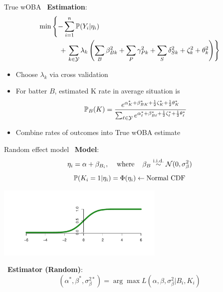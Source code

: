 \documentclass{beamer}
\def\Y{\mathcal Y}\def\Z{\mathcal Z}
\def\l{\left}\def\r{\right}\def\lf{\lfloor}\def\rf{\rfloor}
\def\iid{\stackrel{\mbox{\scriptsize i.i.d.}}{\sim}}
\begin{document}
\begin{frame}{True wOBA}
~{\bf Estimation}:
\begin{align*}
\min&\l\{-\sum_{i=1}^n\mP(Y_i|\eta_i)\r.\\
    &\hspace{4mm} + \l.\sum_{k\in\Y}\lambda_k\l(\sum_B\beta_{Bk}^2
    + \sum_P\gamma_{Pk}^2 + \sum_S\delta_{Sk}^2 + \zeta_k^2 + \theta_k^2\r)\r\}
\end{align*}
\begin{itemize}
    \item Choose $\lambda_k$ via cross validation
    \item For batter $B$, estimated K rate in average situation is
    $$\mP_B(K) = \frac{e^{\alpha^*_K + \beta^*_{BK} + \frac12\zeta^*_K +
    \frac12\theta^*_K}}{\sum_{\ell\in\Y}e^{\alpha^*_\ell + \beta^*_{B\ell} +
    \frac12\zeta^*_\ell + \frac12\theta^*_\ell}}$$
    \item Combine rates of outcomes into True wOBA estimate
\end{itemize}
\end{frame}

\begin{frame}{Random effect model}
~{\bf Model}:
$$\eta_i = \alpha + \beta_{B_i}, \hspace{4mm}\mbox{where}\hspace{4mm}
\beta_B \iid \N(0, \sigma^2_\beta)$$
$$\mathbb P(K_i = 1|\eta_i) = \Phi(\eta_i) \leftarrow \mbox{Normal CDF}$$
\begin{center}
\includegraphics[width = 0.6\textwidth]{../figs/normalcdf.pdf}
\end{center}
~{\bf Estimator (Random)}:
$$(\alpha^*, \beta^*, \sigma^{2*}_\beta) =
    \arg\max L(\alpha, \beta, \sigma^2_\beta|B_i, K_i)$$
\end{frame}
\end{document}
